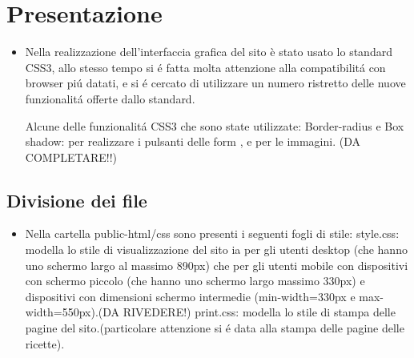 \documentclass[12pt]{article}
\begin{document}
			\section{Presentazione}
			\begin{itemize}
				\item Nella realizzazione dell'interfaccia grafica del sito è stato usato lo standard CSS3, allo stesso tempo si \'e fatta molta attenzione alla compatibilit\'a con browser pi\'u datati, e si \'e cercato di utilizzare un numero ristretto delle nuove funzionalit\'a offerte dallo standard.
				
				Alcune delle funzionalit\'a CSS3 che sono state utilizzate:
				Border-radius e Box shadow: per realizzare i pulsanti delle form , e per le immagini.
				(DA COMPLETARE!!)
				
			\end{itemize}
			\subsection{Divisione dei file}
			\begin{itemize}
				\item Nella cartella public-html/css sono presenti i seguenti fogli di stile:
				style.css: modella lo stile di visualizzazione del sito ia per gli utenti desktop (che hanno uno schermo largo al massimo 890px) che per gli utenti mobile con dispositivi con schermo piccolo (che hanno uno schermo largo massimo 330px) e dispositivi con dimensioni schermo intermedie (min-width=330px e max-width=550px).(DA RIVEDERE!)
				print.css: modella lo stile di stampa delle pagine del sito.(particolare attenzione si \'e data alla stampa delle pagine delle ricette).
				\end{itemize}
\end{document}
